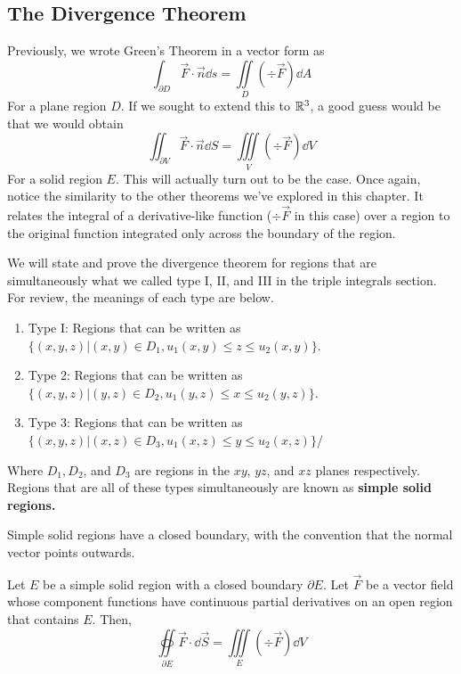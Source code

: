 \subsection{The Divergence Theorem}
Previously, we wrote Green's Theorem in a vector form as
\[ \int_{\partial D} \vec F \cdot \vec n \dd s = \iint\limits_D (\div \vec F)\dd A\]
For a plane region $D$. If we sought to extend this to $\mathbb{R}^3$, a good guess would be that we would obtain
\[ \iint_{\partial V}\vec F \cdot \vec n \dd S = \iiint\limits_V (\div \vec F)\dd V\]
For a solid region $E$. This will actually turn out to be the case. Once again, notice the similarity to the other theorems we've explored in this chapter. It relates the integral of a derivative-like function ($\div \vec F$ in this case) over a region to the original function integrated only across the boundary of the region. \par
We will state and prove the divergence theorem for regions that are simultaneously what we called type I, II, and III in the triple integrals section. For review, the meanings of each type are below.
\begin{enumerate}
    \item Type I: Regions that can be written as $\{(x,y,z)|(x,y)\in D_1, u_1(x,y) \leq z \leq u_2(x,y)\}$.
    \item Type 2: Regions that can be written as $\{(x,y,z)|(y,z)\in D_2, u_1(y,z) \leq x \leq u_2(y,z)\}$.
    \item Type 3: Regions that can be written as $\{(x,y,z)|(x,z)\in D_3, u_1(x,z) \leq y \leq u_2(x,z)\}$/
\end{enumerate}
Where $D_1, D_2$, and $D_3$ are regions in the $xy$, $yz$, and $xz$ planes respectively. Regions that are all of these types simultaneously are known as \bf{simple solid regions}. \par
Simple solid regions have a closed boundary, with the convention that the normal vector points outwards.
\begin{theorem}
    Let $E$ be a simple solid region with a closed boundary $\partial E$. Let $\vec F$ be a vector field whose component functions have continuous partial derivatives on an open region that contains $E$. Then,
    \[ \oiint\limits_{\partial E} \vec F \cdot \dd \vec S = \iiint\limits_E (\div \vec F)\dd V\]
\end{theorem}
